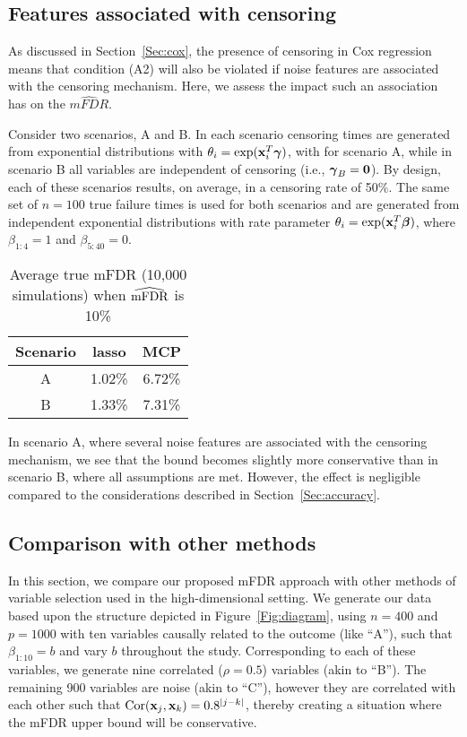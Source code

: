 \subsection{Features associated with censoring}

As discussed in Section~\ref{Sec:cox}, the presence of censoring in Cox regression means that condition (A2) will also be violated if noise features are associated with the censoring mechanism.  Here, we assess the impact such an association has on the $\widehat{mFDR}$.

Consider two scenarios, A and B. In each scenario censoring times are generated from exponential distributions with $\theta_{i} = \exp(\mathbf{x}_i^T \boldsymbol{\gamma})$, with
for scenario A, while in scenario B all variables are independent of censoring (i.e., $\boldsymbol{\gamma}_B = \mathbf{0}$).  By design, each of these scenarios results, on average, in a censoring rate of 50\%.  The same set of $n = 100$ true failure times is used for both scenarios and are generated from independent exponential distributions with rate parameter $\theta_i = \exp(\mathbf{x}_i^T \boldsymbol{\beta})$, where $\beta_{1:4} = 1$ and $\beta_{5:40} = 0$.

\begin{table}[h!]
 \caption{Average true mFDR (10,000 simulations) when $\widehat{\textrm{mFDR}}$ is 10\%}
\centering
\begin{tabular}{c | c c}
  \hline
 Scenario & lasso & MCP   \\  [0.5ex]
  \hline 
   A & 1.02\% & 6.72\% \\ 
   B &  1.33\% & 7.31\% \\ 
   \hline
\end{tabular}
\end{table}


In scenario A, where several noise features are associated with the censoring mechanism, we see that the bound becomes slightly more conservative than in scenario B, where all assumptions are met.  However, the effect is negligible compared to the considerations described in Section~\ref{Sec:accuracy}.

\subsection{Comparison with other methods}
\label{Sec:sim-comp}

In this section, we compare our proposed mFDR approach with other methods of variable selection used in the high-dimensional setting. We generate our data based upon the structure depicted in Figure~\ref{Fig:diagram}, using $n = 400$ and $p = 1000$ with ten variables causally related to the outcome (like ``A''), such that $\beta_{1:10} = b$ and vary $b$ throughout the study. Corresponding to each of these variables, we generate nine correlated ($\rho = 0.5$) variables (akin to ``B''). The remaining 900 variables are noise (akin to ``C''), however they are correlated with each other such that $\textrm{Cor}(\mathbf{x}_j,\mathbf{x}_k) = 0.8^{|j - k|}$, thereby creating a situation where the mFDR upper bound will be conservative.

